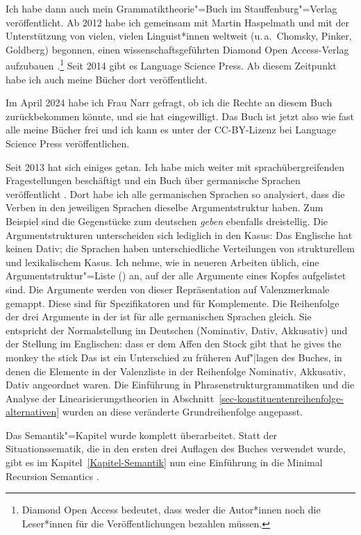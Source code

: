 Ich habe dann auch mein Grammatiktheorie"=Buch im Stauffenburg"=Verlag veröffentlicht. Ab 2012 habe
ich gemeinsam mit Martin Haspelmath und mit der Unterstützung von vielen, vielen Linguist*innen
weltweit (u.\,a.\ Chomsky, Pinker, Goldberg) begonnen, einen wissenschaftsgeführten Diamond Open
Access-Verlag aufzubauen \citep{MuellerOA}.\footnote{Diamond Open Access bedeutet, dass weder die Autor*innen noch die
Leser*innen für die Veröffentlichungen bezahlen müssen.} Seit 2014 gibt es Language Science Press. Ab diesem Zeitpunkt habe ich
auch meine Bücher dort veröffentlicht. 

Im April 2024 habe ich Frau Narr
gefragt, ob ich die Rechte an diesem Buch zurückbekommen könnte, und sie hat eingewilligt. Das Buch
ist jetzt also wie fast alle meine Bücher frei und ich kann es unter der CC-BY-Lizenz bei Language
Science Press veröffentlichen.

Seit 2013 hat sich einiges getan. Ich habe mich weiter mit sprachübergreifenden Fragestellungen
beschäftigt und ein Buch über germanische Sprachen veröffentlicht \citep{MuellerGermanic}. Dort habe
ich alle germanischen Sprachen so analysiert, dass die Verben in den jeweiligen Sprachen dieselbe
Argumentstruktur haben. Zum Beispiel sind die Gegenstücke zum deutschen \emph{geben} ebenfalls
dreistellig. Die Argumentstrukturen unterscheiden sich lediglich in den Kasus: Das Englische hat keinen
Dativ; die Sprachen haben unterschiedliche Verteilungen von strukturellem und lexikalischem
Kasus. Ich nehme, wie in neueren Arbeiten üblich, eine Argumentstruktur"=Liste (\argst) an, auf der 
alle Argumente eines Kopfes aufgelistet sind. Die Argumente werden von dieser Repräsentation auf
Valenzmerkmale gemappt. Diese sind \spr für Spezifikatoren und \comps für Komplemente. Die
Reihenfolge der drei Argumente in der \argst ist für alle germanischen Sprachen gleich. Sie
entspricht der Normalstellung im Deutschen (Nominativ, Dativ, Akkusativ) und der Stellung im
Englischen:
\eal
\ex dass er dem Affen den Stock gibt
\ex that he gives the monkey the stick
\zl
Das ist ein Unterschied zu früheren Auf"|lagen des Buches, in denen die Elemente in der Valenzliste
\subcat in der Reihenfolge Nominativ, Akkusativ, Dativ angeordnet waren. Die Einführung in
Phrasenstrukturgrammatiken und die Analyse der Linearisierungstheorien in Abschnitt~\ref{sec-konstituentenreihenfolge-alternativen} wurden an
diese veränderte Grundreihenfolge angepasst.

Das Semantik"=Kapitel wurde komplett überarbeitet. Statt der Situationssematik, die in den ersten
drei Auf\/lagen des Buches verwendet wurde, gibt es im Kapitel~\ref{Kapitel-Semantik} nun eine
Einführung in die Minimal Recursion Semantics \citep*{CFPS2005a}.

